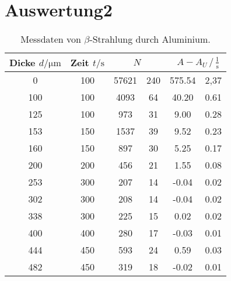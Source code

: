 \section{Auswertung2}
\label{sec:Auswertung2}


\begin{table}[H]
    \centering
    \caption{Messdaten von $\beta$-Strahlung durch Aluminium.}
    \label{tab:Wellenlänge}
    \begin{tabular}{S[table-format=3.0] S[table-format=3.0] S[table-format=5.0] @{${}\pm{}$} S[table-format=3.2] S[table-format=3.2] @{${}\pm{}$} S[table-format=2.2]}
    \toprule
    {Dicke $d / \si{\micro\meter}$} & {Zeit $t / \si{\second}$} &  &  \\
       &   100 &   57621   &   240 &   575.54  &   2,37   \\
        100 &   100 &   4093    &   64  &   40.20   &   0.61    \\
        125 &   100 &   973     &   31  &   9.00    &   0.28    \\
        153 &   150 &   1537    &   39  &   9.52    &   0.23    \\
        160 &   150 &   897     &   30  &   5.25    &   0.17    \\
        200 &   200 &   456     &   21  &   1.55    &   0.08    \\
        253 &   300 &   207     &   14  &   -0.04   &   0.02    \\
        302 &   300 &   208     &   14  &   -0.04   &   0.02    \\
        338 &   300 &   225     &   15  &   0.02    &   0.02    \\
        400 &   400 &   280     &   17  &   -0.03   &   0.01    \\
        444 &   450 &   593     &   24  &   0.59    &   0.03    \\
        482 &   450 &   319     &   18  &   -0.02   &   0.01    \\
    \bottomrule
    \end{tabular}
  \end{table}